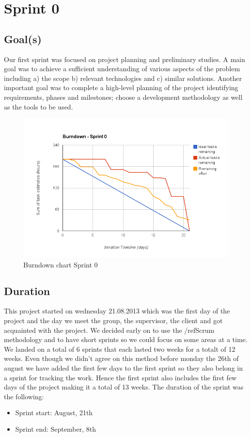 

\chapter{Sprint 0}
\label{Sprint0}

\section{Goal(s)}

Our first sprint was focused on project planning and preliminary studies.
A main goal was to achieve a sufficient understanding of various aspects of the problem
including a) the scope b) relevant technologies and c) similar solutions.
Another important goal was to complete a high-level planning of the project
identifying requirements, phases and milestones; choose a development methodology as well
as the tools to be used.

\begin{figure}[H]
\centering
\includegraphics[scale=0.50]{../Figures/burndownSprint0.png}
\caption{Burndown chart Sprint 0}
\label{figure:burndownsprint0}
\end{figure}


\section{Duration}
This project started on wednesday 21.08.2013 which was the first day of the project and the day we meet the group, the supervisor, the client and got acquainted with the project. We decided early on to use the /ref{Scrum} methodology and to have short sprints so we could focus on some areas at a time. We landed on a total of 6 sprints that each lasted two weeks for a totalt of 12 weeks. Even though we didn't agree on this method before monday the 26th of august we have added the first few days to the first sprint so they also belong in a sprint for tracking the work. Hence the first sprint also includes the first few days of the project making it a total of 13 weeks. 
The duration of the sprint was the following:
\begin{itemize}
\item Sprint start: August, 21th
\item Sprint end: September, 8th
\end{itemize}

